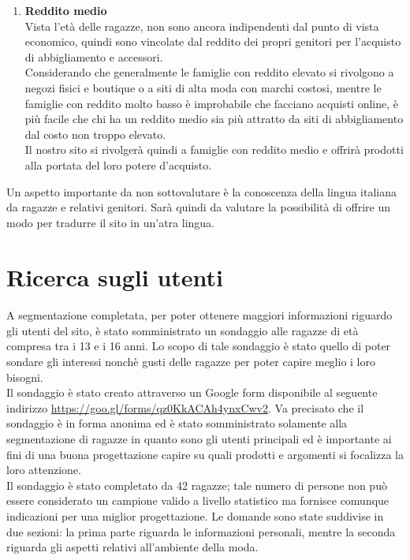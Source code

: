 \documentclass[12pt,a4paper]{report}
\begin{document}
\begin{enumerate}
\begin{enumerate}[label=\alph*.]
   \item \textbf{Reddito medio}\\
   Vista l'età delle ragazze, non sono ancora indipendenti dal punto di vista economico, quindi sono vincolate dal reddito dei propri genitori per l'acquisto di abbigliamento e accessori.\\
   Considerando che generalmente le famiglie con reddito elevato si rivolgono a negozi fisici e boutique o a siti di alta moda con marchi costosi, mentre le famiglie con reddito molto basso è improbabile che facciano acquisti online, è più facile che chi ha un reddito medio sia più attratto da siti di abbigliamento dal costo non troppo elevato.\\
   Il nostro sito si rivolgerà quindi a famiglie con reddito medio e offrirà prodotti alla portata del loro potere d'acquisto.
   \end{enumerate}
 \end{enumerate}
 Un aspetto importante da non sottovalutare è la conoscenza della lingua italiana da ragazze e relativi genitori. Sarà quindi da valutare la possibilità di offrire un modo per tradurre il sito in un'atra lingua.
\section{Ricerca sugli utenti}
\paragraph{}A segmentazione completata, per poter ottenere maggiori informazioni riguardo gli utenti del sito, è stato somministrato un sondaggio alle ragazze di età compresa tra i 13 e i 16 anni. Lo scopo di tale sondaggio è stato quello di poter sondare gli interessi nonchè gusti delle ragazze per poter capire meglio i loro bisogni.\\ Il sondaggio è stato creato attraverso un Google form disponibile al seguente indirizzo \href{run:https://goo.gl/forms/qz0KkACAh4ynxCwv2}{https://goo.gl/forms/qz0KkACAh4ynxCwv2}.
Va precisato che il sondaggio è in forma anonima ed è stato somministrato solamente alla segmentazione di ragazze in quanto sono gli utenti principali ed è importante ai fini di una buona progettazione capire su quali prodotti e argomenti si focalizza la loro attenzione.\\
Il sondaggio è stato completato da 42 ragazze; tale numero di persone non può essere considerato un campione valido a livello statistico ma fornisce comunque indicazioni per una miglior progettazione. Le domande sono state suddivise in due sezioni: la prima parte riguarda le informazioni personali, mentre la seconda riguarda gli aspetti relativi all'ambiente della moda.
\end{document}
